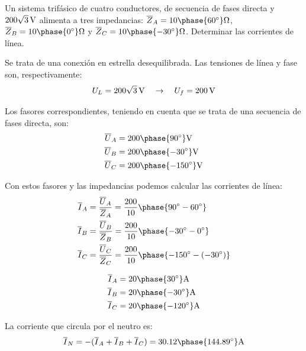         \vspace{4mm}
        \begin{example}\label{ej.estrella-deseq}
Un sistema trifásico de cuatro conductores, de secuencia de fases
directa y $\SI[parse-numbers=false]{200\sqrt{3}}{\volt}$ alimenta a
tres impedancias:
$\overline{Z}_{A} =
{10\phase{\ang{60}}}\unit{\ohm}$,
$\overline{Z}_{B} = {10\phase{\ang{0}}}\unit{\ohm}$
y
$\overline{Z}_{C} =
{10\phase{\ang{-30}}}\unit{\ohm}$. Determinar las
corrientes de línea.

\vspace{1mm}
\hspace*{-5mm}\hrulefill

\vspace{4mm}
        
Se trata de una conexión en estrella desequilibrada. Las tensiones de línea y fase son, respectivamente:
\[ U_L = \SI[parse-numbers=false]{200\sqrt{3}}{\volt} \quad \rightarrow \quad U_f =
  \SI{200}{\volt}
\]

Los fasores correspondientes, teniendo en cuenta que se trata de una secuencia de fases directa, son:
\begin{align*}
  \overline{U}_A &= {200\phase{\ang{90}}}\unit{\volt}\\
  \overline{U}_B &= {200\phase{\ang{-30}}}\unit{\volt}\\
  \overline{U}_C &= {200\phase{\ang{-150}}}\unit{\volt}\\
\end{align*}

Con estos fasores y las impedancias podemos calcular las corrientes de línea:
\begin{align*}
  \overline{I}_A &= \frac{\overline{U}_A}{\overline{Z}_A} = \frac{200}{10}\phase{\ang{90} - \ang{60}} \\
  \overline{I}_B &= \frac{\overline{U}_B}{\overline{Z}_B} = \frac{200}{10}\phase{\ang{-30} - \ang{0}}\\
  \overline{I}_C &= \frac{\overline{U}_C}{\overline{Z}_C} = \frac{200}{10}\phase{\ang{-150} - (\ang{-30})}
\end{align*}

 \begin{align*}
   \overline{I}_A &= {20\phase{\ang{30}}}\unit{\ampere}\\
   \overline{I}_B &= {20\phase{\ang{-30}}}\unit{\ampere}\\
   \overline{I}_C &= {20\phase{\ang{-120}}}\unit{\ampere}
 \end{align*}

 La corriente que circula por el neutro es:
 \[
   \overline{I}_N = -(\overline{I}_A + \overline{I}_B +
   \overline{I}_C) = {30.12\phase{\ang{144.89}}}\unit{\ampere}
 \]


\end{example}
	
